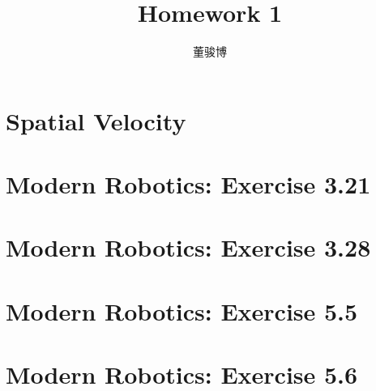 \documentclass[onecolumn,oneside]{SUSTechHomework}
\author{董骏博}
\title{Homework 1}
\begin{document}
  \maketitle

  \section{Spatial Velocity}
  
  \section{Modern Robotics: Exercise 3.21}
  
  \section{Modern Robotics: Exercise 3.28}
  
  \section{Modern Robotics: Exercise 5.5}
  
  \section{Modern Robotics: Exercise 5.6}
  
\end{document}
